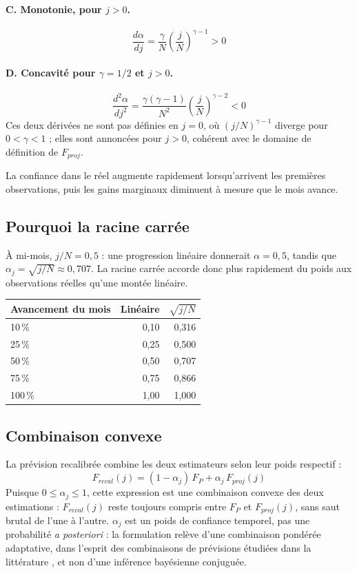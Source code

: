 \documentclass[11pt,a4paper]{article}
\begin{document}
\paragraph{C. Monotonie, pour $j>0$.}
\[
\frac{d\alpha}{dj} = \frac{\gamma}{N}\left(\frac{j}{N}\right)^{\gamma-1} > 0
\]

\paragraph{D. Concavité pour $\gamma=1/2$ et $j>0$.}
\[
\frac{d^2\alpha}{dj^2} = \frac{\gamma(\gamma-1)}{N^2}\left(\frac{j}{N}\right)^{\gamma-2} < 0
\]
Ces deux dérivées ne sont pas définies en $j=0$, où $(j/N)^{\gamma-1}$ diverge pour $0<\gamma<1$ ; elles sont annoncées pour $j>0$, cohérent avec le domaine de définition de $F_{proj}$.

La confiance dans le réel augmente rapidement lorsqu'arrivent les premières observations, puis les gains marginaux diminuent à mesure que le mois avance.

\subsection{Pourquoi la racine carrée}

À mi-mois, $j/N=0{,}5$ : une progression linéaire donnerait $\alpha=0{,}5$, tandis que $\alpha_j=\sqrt{j/N}\approx0{,}707$. La racine carrée accorde donc plus rapidement du poids aux observations réelles qu'une montée linéaire.

\begin{center}
\small
\begin{tabular}{lrr}
\toprule
Avancement du mois & Linéaire & $\sqrt{j/N}$ \\
\midrule
10\,\% & 0,10 & 0,316 \\
25\,\% & 0,25 & 0,500 \\
50\,\% & 0,50 & 0,707 \\
75\,\% & 0,75 & 0,866 \\
100\,\% & 1,00 & 1,000 \\
\bottomrule
\end{tabular}
\end{center}

\subsection{Combinaison convexe}

La prévision recalibrée combine les deux estimateurs selon leur poids respectif :
\[
F_{recal}(j) = (1-\alpha_j)\,F_P + \alpha_j\,F_{proj}(j)
\]
Puisque $0\le\alpha_j\le1$, cette expression est une combinaison convexe des deux estimations : $F_{recal}(j)$ reste toujours compris entre $F_P$ et $F_{proj}(j)$, sans saut brutal de l'une à l'autre. $\alpha_j$ est un poids de confiance temporel, pas une probabilité \emph{a posteriori} : la formulation relève d'une combinaison pondérée adaptative, dans l'esprit des combinaisons de prévisions étudiées dans la littérature \cite{batesgranger1969,timmermann2006}, et non d'une inférence bayésienne conjuguée.
\end{document}
